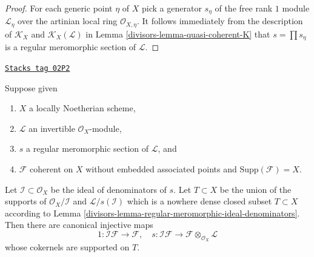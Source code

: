 \begin{proof}

For each generic point $\eta$ of $X$ pick a generator
$s_\eta$ of the free rank $1$ module $\mathcal{L}_\eta$
over the artinian local ring $\mathcal{O}_{X, \eta}$.
It follows immediately from the description of
$\mathcal{K}_X$ and $\mathcal{K}_X(\mathcal{L})$ in
Lemma \ref{divisors-lemma-quasi-coherent-K} that $s = \prod s_\eta$
is a regular meromorphic section of $\mathcal{L}$.
\end{proof}

\begin{lemma}
\label{divisors-lemma-make-maps-regular-section}
\href{https://stacks.math.columbia.edu/tag/02P2}{\texttt{Stacks tag 02P2}}

Suppose given
\begin{enumerate}
\item $X$ a locally Noetherian scheme,
\item $\mathcal{L}$ an invertible $\mathcal{O}_X$-module,
\item $s$ a regular meromorphic section of $\mathcal{L}$, and
\item $\mathcal{F}$ coherent on $X$
without embedded associated points and $\text{Supp}(\mathcal{F}) = X$.
\end{enumerate}
Let $\mathcal{I} \subset \mathcal{O}_X$ be the ideal of
denominators of $s$. Let $T \subset X$ be the union
of the supports of $\mathcal{O}_X/\mathcal{I}$ and
$\mathcal{L}/s(\mathcal{I})$ which is a nowhere dense closed
subset $T \subset X$ according to
Lemma \ref{divisors-lemma-regular-meromorphic-ideal-denominators}.
Then there are canonical injective maps
$$
1 : \mathcal{I}\mathcal{F} \to \mathcal{F}, \quad
s : \mathcal{I}\mathcal{F} \to \mathcal{F} \otimes_{\mathcal{O}_X}\mathcal{L}
$$
whose cokernels are supported on $T$.
\end{lemma}

